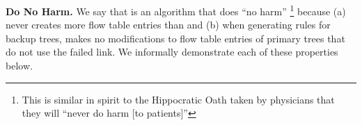 



{\bf Do No Harm.} 
We say that \merge is an algorithm that does ``no harm''  \footnote{This is similar in spirit to the Hippocratic Oath taken by physicians that they will ``never do harm [to patients]'' }
because (a) \merge never creates more flow table entries than \base and (b) when generating rules for backup trees, \merge makes no modifications to flow table entries of primary trees 
that do not use the failed link. We informally demonstrate each of these properties below.

